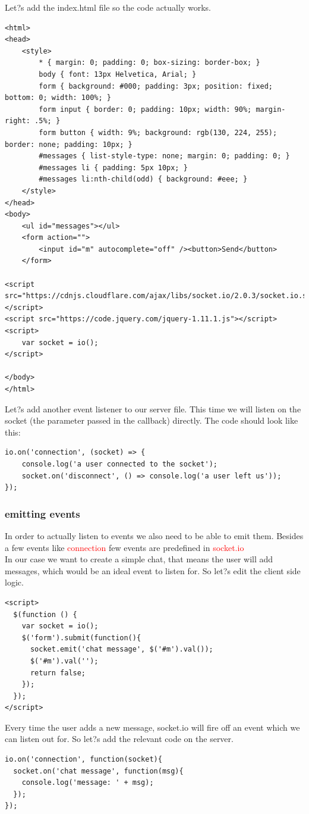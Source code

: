 \documentclass[a4paper]{article}
\begin{document}
Let?s add the index.html file so the code actually works.
\begin{lstlisting}
<html>
<head>
    <style>
        * { margin: 0; padding: 0; box-sizing: border-box; }
        body { font: 13px Helvetica, Arial; }
        form { background: #000; padding: 3px; position: fixed; bottom: 0; width: 100%; }
        form input { border: 0; padding: 10px; width: 90%; margin-right: .5%; }
        form button { width: 9%; background: rgb(130, 224, 255); border: none; padding: 10px; }
        #messages { list-style-type: none; margin: 0; padding: 0; }
        #messages li { padding: 5px 10px; }
        #messages li:nth-child(odd) { background: #eee; }
    </style>
</head>
<body>
    <ul id="messages"></ul>
    <form action="">
        <input id="m" autocomplete="off" /><button>Send</button>
    </form>

<script src="https://cdnjs.cloudflare.com/ajax/libs/socket.io/2.0.3/socket.io.slim.js"></script>
<script src="https://code.jquery.com/jquery-1.11.1.js"></script>
<script>
    var socket = io();
</script>

</body>
</html>
\end{lstlisting}
Let?s add another event listener to our server file. This time we will listen on the socket (the parameter passed in the callback) directly. The code should look like this:
\begin{lstlisting}
io.on('connection', (socket) => {
    console.log('a user connected to the socket');
    socket.on('disconnect', () => console.log('a user left us'));
});
\end{lstlisting}
\subsubsection{emitting events}
In order to actually listen to events we also need to be able to emit them. Besides a few events like \textcolor{red}{connection} few events are predefined in \textcolor{red}{socket.io}\\

In our case we want to create a simple chat, that means the user will add messages, which would be an ideal event to listen for. So let?s edit the client side logic.
\begin{lstlisting}
<script>
  $(function () {
    var socket = io();
    $('form').submit(function(){
      socket.emit('chat message', $('#m').val());
      $('#m').val('');
      return false;
    });
  });
</script>
\end{lstlisting}
Every time the user adds a new message, socket.io will fire off an event which we can listen out for. So let?s add the relevant code on the server.
\begin{lstlisting}
io.on('connection', function(socket){
  socket.on('chat message', function(msg){
    console.log('message: ' + msg);
  });
});

\end{lstlisting}
\end{document}
